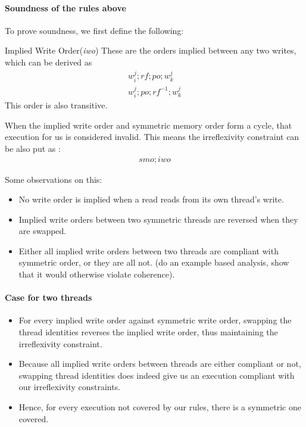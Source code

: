\paragraph{Soundness of the rules above}

    To prove soundness, we first define the following: 

    \begin{definition}{Implied Write Order(\emph{iwo})}
        These are the orders implied between any two writes, which can be derived as 
        \begin{align*}
            w_i^j;rf;po;w_k^j \\
            w_i^j;po;rf^{-1};w_k^j
        \end{align*}
        This order is also transitive. 
    \end{definition}

    When the implied write order and symmetric memory order form a cycle, that execution for us is considered invalid. This means the irreflexivity constraint can be also put as :
    \begin{align*}
        smo;iwo
    \end{align*}

    Some observations on this:
    \begin{itemize}
        \item No write order is implied when a read reads from its own thread's write.
        \item Implied write orders between two symmetric threads are reversed when they are swapped.
        \item Either all implied write orders between two threads are compliant with symmetric order, or they are all not. (do an example based analysis, show that it would otherwise violate coherence).
    \end{itemize}

    \paragraph{Case for two threads}

        \begin{itemize}
            \item For every implied write order against symmetric write order, swapping the thread identities reverses the implied write order, thus maintaining the irreflexivity constraint.
            \item Because all implied write orders between threads are either compliant or not, swapping thread identities does indeed give us an execution compliant with our irreflexivity constraints. 
            \item Hence, for every execution not covered by our rules, there is a symmetric one covered. 
        \end{itemize}

